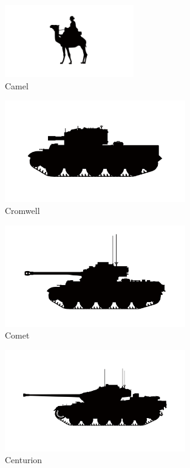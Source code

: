 \begin{figure}[h]
  \centering
  \includegraphics[width=0.5\textwidth]{platforms/camel.pdf}
  \caption*{Camel}
\end{figure}

\begin{figure}[h]
  \centering
  \includegraphics[width=0.7\textwidth]{platforms/cromwell.pdf}
  \caption*{Cromwell}
\end{figure}

\begin{figure}[h]
  \centering
  \includegraphics[width=0.7\textwidth]{platforms/comet.pdf}
  \caption*{Comet}
\end{figure}

\begin{figure}[h]
  \centering
  \includegraphics[width=0.7\textwidth]{platforms/centurion.pdf}
  \caption*{Centurion}
\end{figure}

